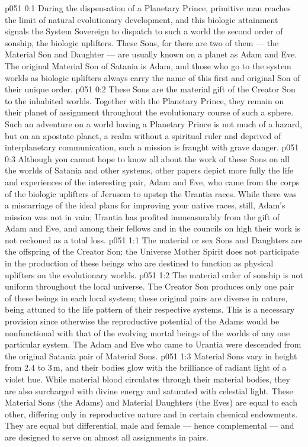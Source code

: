\author{Secondary Lanonandek}
\vs p051 0:1 During the dispensation of a Planetary Prince, primitive man reaches the limit of natural evolutionary development, and this biologic attainment signals the System Sovereign to dispatch to such a world the second order of sonship, the biologic uplifters. These Sons, for there are two of them --- the Material Son and Daughter --- are usually known on a planet as Adam and Eve. The original Material Son of Satania is Adam, and those who go to the system worlds as biologic uplifters always carry the name of this first and original Son of their unique order.
\vs p051 0:2 These Sons are the material gift of the Creator Son to the inhabited worlds. Together with the Planetary Prince, they remain on their planet of assignment throughout the evolutionary course of such a sphere. Such an adventure on a world having a Planetary Prince is not much of a hazard, but on an apostate planet, a realm without a spiritual ruler and deprived of interplanetary communication, such a mission is fraught with grave danger.
\vs p051 0:3 Although you cannot hope to know all about the work of these Sons on all the worlds of Satania and other systems, other papers depict more fully the life and experiences of the interesting pair, Adam and Eve, who came from the corps of the biologic uplifters of Jerusem to upstep the Urantia races. While there was a miscarriage of the ideal plans for improving your native races, still, Adam’s mission was not in vain; Urantia has profited immeasurably from the gift of Adam and Eve, and among their fellows and in the councils on high their work is not reckoned as a total loss.
\vs p051 1:1 The material or sex Sons and Daughters are the offspring of the Creator Son; the Universe Mother Spirit does not participate in the production of these beings who are destined to function as physical uplifters on the evolutionary worlds.
\vs p051 1:2 The material order of sonship is not uniform throughout the local universe. The Creator Son produces only one pair of these beings in each local system; these original pairs are diverse in nature, being attuned to the life pattern of their respective systems. This is a necessary provision since otherwise the reproductive potential of the Adams would be nonfunctional with that of the evolving mortal beings of the worlds of any one particular system. The Adam and Eve who came to Urantia were descended from the original Satania pair of Material Sons.
\vs p051 1:3 \pc Material Sons vary in height from 2.4 to 3\,m, and their bodies glow with the brilliance of radiant light of a violet hue. While material blood circulates through their material bodies, they are also surcharged with divine energy and saturated with celestial light. These Material Sons (the Adams) and Material Daughters (the Eves) are equal to each other, differing only in reproductive nature and in certain chemical endowments. They are equal but differential, male and female --- hence complemental --- and are designed to serve on almost all assignments in pairs.
